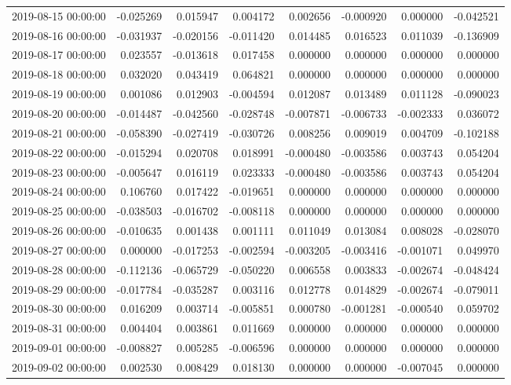 \begin{tabular}{lrrrrrrr}
2019-08-15 00:00:00 & -0.025269 & 0.015947 & 0.004172 & 0.002656 & -0.000920 & 0.000000 & -0.042521 \\
2019-08-16 00:00:00 & -0.031937 & -0.020156 & -0.011420 & 0.014485 & 0.016523 & 0.011039 & -0.136909 \\
2019-08-17 00:00:00 & 0.023557 & -0.013618 & 0.017458 & 0.000000 & 0.000000 & 0.000000 & 0.000000 \\
2019-08-18 00:00:00 & 0.032020 & 0.043419 & 0.064821 & 0.000000 & 0.000000 & 0.000000 & 0.000000 \\
2019-08-19 00:00:00 & 0.001086 & 0.012903 & -0.004594 & 0.012087 & 0.013489 & 0.011128 & -0.090023 \\
2019-08-20 00:00:00 & -0.014487 & -0.042560 & -0.028748 & -0.007871 & -0.006733 & -0.002333 & 0.036072 \\
2019-08-21 00:00:00 & -0.058390 & -0.027419 & -0.030726 & 0.008256 & 0.009019 & 0.004709 & -0.102188 \\
2019-08-22 00:00:00 & -0.015294 & 0.020708 & 0.018991 & -0.000480 & -0.003586 & 0.003743 & 0.054204 \\
2019-08-23 00:00:00 & -0.005647 & 0.016119 & 0.023333 & -0.000480 & -0.003586 & 0.003743 & 0.054204 \\
2019-08-24 00:00:00 & 0.106760 & 0.017422 & -0.019651 & 0.000000 & 0.000000 & 0.000000 & 0.000000 \\
2019-08-25 00:00:00 & -0.038503 & -0.016702 & -0.008118 & 0.000000 & 0.000000 & 0.000000 & 0.000000 \\
2019-08-26 00:00:00 & -0.010635 & 0.001438 & 0.001111 & 0.011049 & 0.013084 & 0.008028 & -0.028070 \\
2019-08-27 00:00:00 & 0.000000 & -0.017253 & -0.002594 & -0.003205 & -0.003416 & -0.001071 & 0.049970 \\
2019-08-28 00:00:00 & -0.112136 & -0.065729 & -0.050220 & 0.006558 & 0.003833 & -0.002674 & -0.048424 \\
2019-08-29 00:00:00 & -0.017784 & -0.035287 & 0.003116 & 0.012778 & 0.014829 & -0.002674 & -0.079011 \\
2019-08-30 00:00:00 & 0.016209 & 0.003714 & -0.005851 & 0.000780 & -0.001281 & -0.000540 & 0.059702 \\
2019-08-31 00:00:00 & 0.004404 & 0.003861 & 0.011669 & 0.000000 & 0.000000 & 0.000000 & 0.000000 \\
2019-09-01 00:00:00 & -0.008827 & 0.005285 & -0.006596 & 0.000000 & 0.000000 & 0.000000 & 0.000000 \\
2019-09-02 00:00:00 & 0.002530 & 0.008429 & 0.018130 & 0.000000 & 0.000000 & -0.007045 & 0.000000 \\

\end{tabular}
